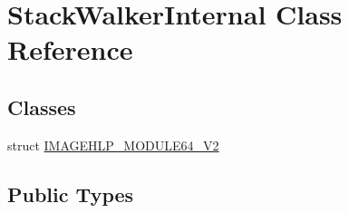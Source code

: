 \hypertarget{class_stack_walker_internal}{\section{Stack\-Walker\-Internal Class Reference}
\label{class_stack_walker_internal}
}
\subsection*{Classes}
\begin{DoxyCompactItemize}
\item 
struct \hyperlink{struct_stack_walker_internal_1_1_i_m_a_g_e_h_l_p___m_o_d_u_l_e64___v2}{I\-M\-A\-G\-E\-H\-L\-P\-\_\-\-M\-O\-D\-U\-L\-E64\-\_\-\-V2}
\end{DoxyCompactItemize}
\subsection*{Public Types}
